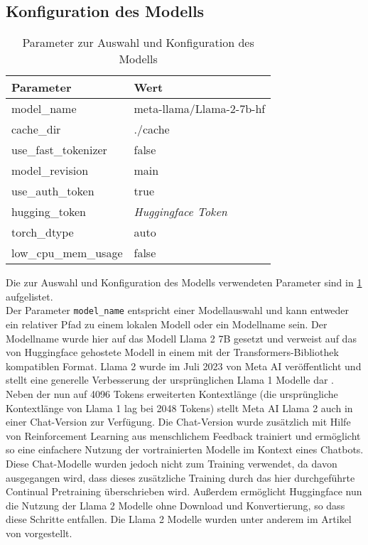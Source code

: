 \subsection{Konfiguration des Modells}
\begin{table}
    \centering
    \begin{tabular}{ll}
        \toprule
        \textbf{Parameter}   & \textbf{Wert}              \\
        \midrule
        model\_name          & meta-llama/Llama-2-7b-hf   \\
        cache\_dir           & ./cache                    \\
        use\_fast\_tokenizer & false                      \\
        model\_revision      & main                       \\
        use\_auth\_token     & true                       \\
        hugging\_token       & \textit{Huggingface Token} \\
        torch\_dtype         & auto                       \\
        low\_cpu\_mem\_usage & false                      \\
    \end{tabular}
    \caption[Parameter zur Konfiguration des Modells]{Parameter zur Auswahl und Konfiguration des Modells}\label{tab:model-config}
\end{table}
Die zur Auswahl und Konfiguration des Modells verwendeten Parameter sind in \cref{tab:model-config} aufgelistet.\\

Der Parameter \texttt{model\_name} entspricht einer Modellauswahl und kann entweder ein relativer Pfad zu einem lokalen Modell oder ein Modellname sein.
Der Modellname wurde hier auf das Modell Llama 2 7B gesetzt und verweist auf das von Huggingface gehostete Modell in einem mit der Transformers-Bibliothek kompatiblen Format.
Llama 2 wurde im Juli 2023 von Meta AI veröffentlicht und stellt eine generelle Verbesserung der ursprünglichen Llama 1 Modelle dar \citep{llama2}.
Neben der nun auf 4096 Tokens erweiterten Kontextlänge (die ursprüngliche Kontextlänge von Llama 1 lag bei 2048 Tokens) stellt Meta AI Llama 2 auch in einer Chat-Version zur Verfügung.
Die Chat-Version wurde zusätzlich mit Hilfe von Reinforcement Learning aus menschlichem Feedback trainiert und ermöglicht so eine einfachere Nutzung der vortrainierten Modelle im Kontext eines Chatbots.
Diese Chat-Modelle wurden jedoch nicht zum Training verwendet, da davon ausgegangen wird, dass dieses zusätzliche Training durch das hier durchgeführte Continual Pretraining überschrieben wird.
Außerdem ermöglicht Huggingface nun die Nutzung der Llama 2 Modelle ohne Download und Konvertierung, so dass diese Schritte entfallen.
Die Llama 2 Modelle wurden unter anderem im Artikel von \citet{llama2} vorgestellt.\\

